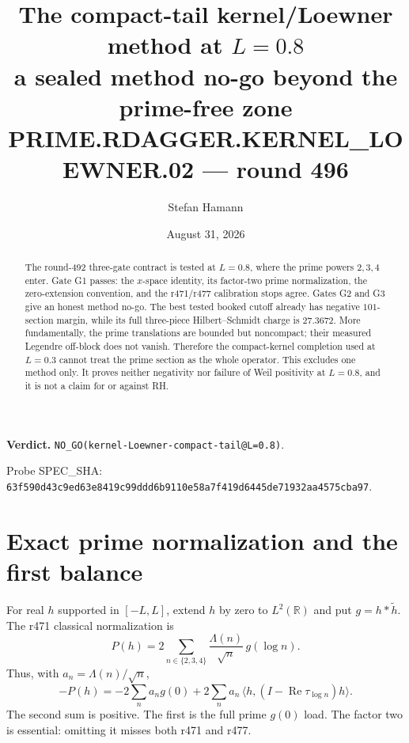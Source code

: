 \documentclass[11pt]{article}
\title{\bfseries The compact-tail kernel/Loewner method at $L=0.8$\\[2mm]
\large a sealed method no-go beyond the prime-free zone\\[2mm]
\large PRIME.RDAGGER.KERNEL\_LOEWNER.02 --- round 496}
\author{Stefan Hamann}
\date{August 31, 2026}
\begin{document}
\maketitle

\begin{abstract}\noindent
The round-492 three-gate contract is tested at $L=0.8$, where the prime
powers $2,3,4$ enter.  Gate G1 passes: the $x$-space identity, its
factor-two prime normalization, the zero-extension convention, and the
r471/r477 calibration stops agree.  Gates G2 and G3 give an honest
method no-go.  The best tested booked cutoff already has negative
$101$-section margin, while its full three-piece Hilbert--Schmidt
charge is $27.3672$.  More fundamentally, the prime translations are
bounded but noncompact; their measured Legendre off-block does not
vanish.  Therefore the compact-kernel completion used at $L=0.3$
cannot treat the prime section as the whole operator.  This excludes
one method only.  It proves neither negativity nor failure of Weil
positivity at $L=0.8$, and it is not a claim for or against RH.
\end{abstract}

\medskip\noindent
\textbf{Verdict.}\enspace
\texttt{NO\_GO(kernel-Loewner-compact-tail@L=0.8)}.

\smallskip\noindent
Probe SPEC\_SHA:
\nolinkurl{63f590d43c9ed63e8419c99ddd6b9110e58a7f419d6445de71932aa4575cba97}.

\begin{center}
\end{center}

\section{Exact prime normalization and the first balance}

For real $h$ supported in $[-L,L]$, extend $h$ by zero to
$L^2(\mathbb R)$ and put $g=h*\widetilde h$.  The r471 classical
normalization is
\[
 P(h)=2\sum_{n\in\{2,3,4\}}
       \frac{\Lambda(n)}{\sqrt n}\,g(\log n).
\]
Thus, with $a_n=\Lambda(n)/\sqrt n$,
\[
 -P(h)=-2\sum_n a_n g(0)
       +2\sum_n a_n\,
          \langle h,(I-\operatorname{Re}\tau_{\log n})h\rangle .
\]
The second sum is positive.  The first is the full prime $g(0)$
load.  The factor two is essential: omitting it misses both r471 and
r477.
\end{document}
